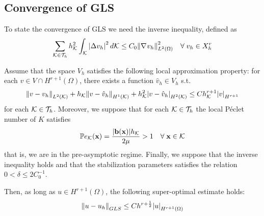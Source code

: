 \subsection{Convergence of GLS}
To state the convergence of GLS we need the inverse inequality, defined as
\begin{equation}
    \sum_{{\mathcal{K}\in\mathcal{T}_h}} h^2_{\mathcal{K}} \int_{\mathcal{K}} \abs{\Delta v_h}^2 \, d\mathcal{K} \leq C_0 \norm{\nabla\mspace{1mu} v_h}_{L^2(\Omega)}^2 \quad \forall \; v_h \in X_h^r
    \label{inverse_inequality_adr}
\end{equation}
\begin{theorem}
    Assume that the space \(V_h\) satisfies the following local approximation property: for each \(v \in V \cap H^{r+1}(\Omega)\), there exists a function \(\hat{v}_h \in V_h\) s.t. 
    \begin{equation}
        \norm{v-v_h}_{L^2(\mathcal{K})} + h_{\mathcal{K}} \norm{v-\hat{v}_h}_{H^1(\mathcal{K})} + h^2_{\mathcal{K}} \abs{v-\hat{v}_h}_{H^2(\mathcal{K})} \leq Ch^{r+1}_{\mathcal{K}} \abs{v}_{H^{r+1}}
        \label{convergence_gls_adr}
    \end{equation}
    for each \({\mathcal{K}\in\mathcal{T}_h}\). Moreover, we suppose that for each \({\mathcal{K}\in\mathcal{T}_h}\) the local Péclet number of \(K\) satisfies 
    \begin{equation}
        \mathbb{P}e_{\mathcal{K}} (\textbf{x}) = \frac{\abs{\textbf{b}(\textbf{x})}h_{\mathcal{K}}}{2\mu} > 1 \quad \forall \; \textbf{x} \in \mathcal{K}
        \label{local_peclet_adr}
    \end{equation}
    that is, we are in the pre-asymptotic regime. Finally, we suppose that the inverse inequality holds and that the stabilization parameters satisfies the relation \(0 < \delta \leq 2C_0^{-1}\).

    Then, as long as \(u \in H^{r+1}(\Omega)\), the following super-optimal estimate holds:
    \begin{equation}
        \norm{u-u_h}_{GLS} \leq Ch^{r+\frac{1}{2}} \abs{u}_{H^{r+1}(\Omega)}        
        \label{super-estimate_adr}
    \end{equation}
\end{theorem}

